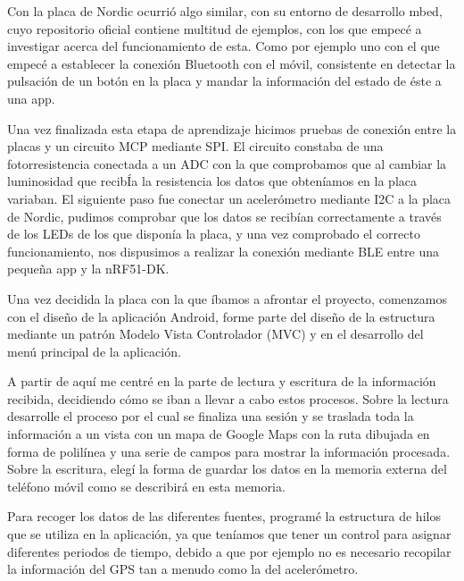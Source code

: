Con la placa de Nordic ocurrió algo similar, con su entorno de desarrollo mbed, cuyo repositorio oficial contiene multitud de ejemplos, con los que empecé a investigar acerca del funcionamiento de esta. Como por ejemplo uno con el que empecé a establecer la conexión Bluetooth con el móvil, consistente en detectar la pulsación de un botón en la placa y mandar la información del estado de éste a una app.

Una vez finalizada esta etapa de aprendizaje hicimos pruebas de conexión entre la placas y un circuito MCP mediante SPI. El circuito constaba de una fotorresistencia conectada a un ADC con la que comprobamos que al cambiar la luminosidad que recibÍa la resistencia los datos que obteníamos en la placa variaban. El siguiente paso fue conectar un acelerómetro mediante I2C a la placa de Nordic, pudimos comprobar que los datos se recibían correctamente a través de los LEDs de los que disponía la placa, y una vez comprobado el correcto funcionamiento, nos dispusimos a realizar la conexión mediante BLE entre una pequeña app y la nRF51-DK. 

Una vez decidida la placa con la que íbamos a afrontar el proyecto, comenzamos con el diseño de la aplicación Android, forme parte del diseño de la estructura mediante un patrón Modelo Vista Controlador (MVC) y en el desarrollo del menú principal de la aplicación. 

A partir de aquí me centré en la parte de lectura y escritura de la información recibida, decidiendo cómo se iban a llevar a cabo estos procesos. 
Sobre la lectura desarrolle el proceso por el cual se finaliza una sesión y se traslada toda la información a un vista con un mapa de Google Maps con la ruta dibujada en forma de polilínea y una serie de campos para mostrar la información procesada. 
Sobre la escritura, elegí la forma de guardar los datos en la memoria externa del teléfono móvil como se describirá en esta memoria.   

Para recoger los datos de las diferentes fuentes, programé la estructura de hilos que se utiliza en la aplicación, ya que teníamos que tener un control para asignar diferentes periodos de tiempo, debido a que por ejemplo no es necesario recopilar la información del GPS tan a menudo como la del acelerómetro.

%
%
%

